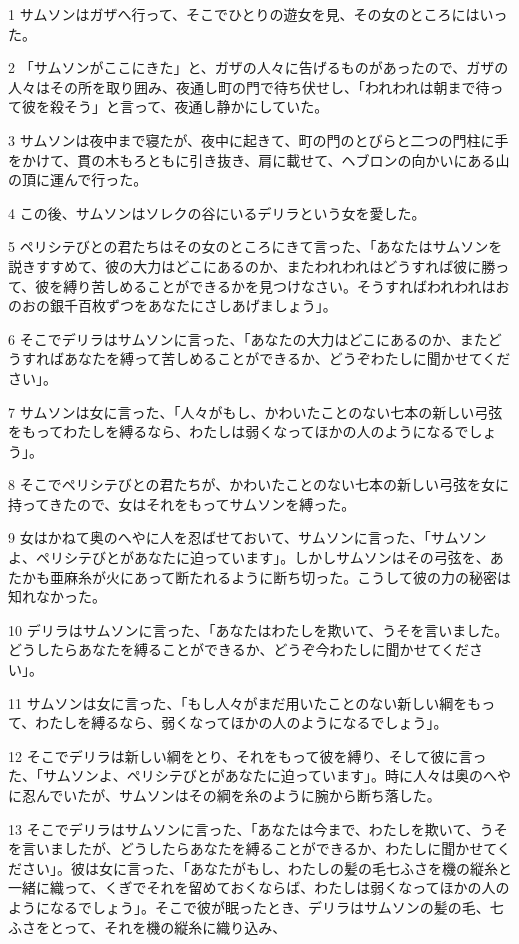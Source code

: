 \par 1 サムソンはガザへ行って、そこでひとりの遊女を見、その女のところにはいった。
\par 2 「サムソンがここにきた」と、ガザの人々に告げるものがあったので、ガザの人々はその所を取り囲み、夜通し町の門で待ち伏せし、「われわれは朝まで待って彼を殺そう」と言って、夜通し静かにしていた。
\par 3 サムソンは夜中まで寝たが、夜中に起きて、町の門のとびらと二つの門柱に手をかけて、貫の木もろともに引き抜き、肩に載せて、ヘブロンの向かいにある山の頂に運んで行った。
\par 4 この後、サムソンはソレクの谷にいるデリラという女を愛した。
\par 5 ペリシテびとの君たちはその女のところにきて言った、「あなたはサムソンを説きすすめて、彼の大力はどこにあるのか、またわれわれはどうすれば彼に勝って、彼を縛り苦しめることができるかを見つけなさい。そうすればわれわれはおのおの銀千百枚ずつをあなたにさしあげましょう」。
\par 6 そこでデリラはサムソンに言った、「あなたの大力はどこにあるのか、またどうすればあなたを縛って苦しめることができるか、どうぞわたしに聞かせてください」。
\par 7 サムソンは女に言った、「人々がもし、かわいたことのない七本の新しい弓弦をもってわたしを縛るなら、わたしは弱くなってほかの人のようになるでしょう」。
\par 8 そこでペリシテびとの君たちが、かわいたことのない七本の新しい弓弦を女に持ってきたので、女はそれをもってサムソンを縛った。
\par 9 女はかねて奥のへやに人を忍ばせておいて、サムソンに言った、「サムソンよ、ペリシテびとがあなたに迫っています」。しかしサムソンはその弓弦を、あたかも亜麻糸が火にあって断たれるように断ち切った。こうして彼の力の秘密は知れなかった。
\par 10 デリラはサムソンに言った、「あなたはわたしを欺いて、うそを言いました。どうしたらあなたを縛ることができるか、どうぞ今わたしに聞かせてください」。
\par 11 サムソンは女に言った、「もし人々がまだ用いたことのない新しい綱をもって、わたしを縛るなら、弱くなってほかの人のようになるでしょう」。
\par 12 そこでデリラは新しい綱をとり、それをもって彼を縛り、そして彼に言った、「サムソンよ、ペリシテびとがあなたに迫っています」。時に人々は奥のへやに忍んでいたが、サムソンはその綱を糸のように腕から断ち落した。
\par 13 そこでデリラはサムソンに言った、「あなたは今まで、わたしを欺いて、うそを言いましたが、どうしたらあなたを縛ることができるか、わたしに聞かせてください」。彼は女に言った、「あなたがもし、わたしの髪の毛七ふさを機の縦糸と一緒に織って、くぎでそれを留めておくならば、わたしは弱くなってほかの人のようになるでしょう」。そこで彼が眠ったとき、デリラはサムソンの髪の毛、七ふさをとって、それを機の縦糸に織り込み、
